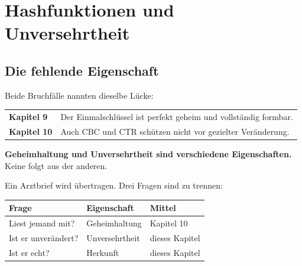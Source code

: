 \chapter{Hashfunktionen und Unversehrtheit}

\section{Die fehlende Eigenschaft}

\begin{merksatz}
Beide Bruchfälle nannten dieselbe Lücke:

\begin{center}
{\small
\renewcommand{\arraystretch}{1.5}
\begin{tabular}{@{}P{2.4cm}P{6.2cm}@{}}
\toprule
\textbf{Kapitel 9} & Der Einmalschlüssel ist perfekt geheim und vollständig formbar.\\
\textbf{Kapitel 10} & Auch CBC und CTR schützen nicht vor gezielter Veränderung.\\
\bottomrule
\end{tabular}}
\end{center}

\begin{center}
\begin{minipage}{0.9\textwidth}
\textbf{Geheimhaltung und Unversehrtheit sind verschiedene Eigenschaften.} Keine folgt aus der anderen.
\end{minipage}
\end{center}

Ein Arztbrief wird übertragen. Drei Fragen sind zu trennen:

\begin{center}
{\small
\renewcommand{\arraystretch}{1.5}
\begin{tabular}{@{}P{2.4cm}P{3.0cm}P{2.8cm}@{}}
\toprule
\textbf{Frage} & \textbf{Eigenschaft} & \textbf{Mittel}\\
\midrule
Liest jemand mit? & Geheimhaltung & Kapitel 10\\
Ist er unverändert? & Unversehrtheit & \textcolor{akzent}{dieses Kapitel}\\
Ist er echt? & Herkunft & \textcolor{akzent}{dieses Kapitel}\\
\bottomrule
\end{tabular}}
\end{center}

\begin{center}
\begin{minipage}{0.88\textwidth}
\end{minipage}
\end{center}
\end{merksatz}

